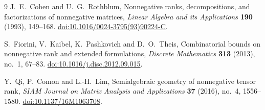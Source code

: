 \documentclass[11pt,a4paper]{article}
\theoremstyle{definition}
\begin{document}
{\small
\begin{thebibliography}{9}
J.~E.~Cohen and U.~G.~Rothblum,
Nonnegative ranks, decompositions, and factorizations of nonnegative matrices,
\textit{Linear Algebra and its Applications} \textbf{190} (1993), 149--168.
\href{https://doi.org/10.1016/0024-3795(93)90224-C}{doi:10.1016/0024-3795(93)90224-C}.

S.~Fiorini, V.~Kaibel, K.~Pashkovich and D.~O.~Theis,
Combinatorial bounds on nonnegative rank and extended formulations,
\textit{Discrete Mathematics} \textbf{313} (2013), no.~1, 67--83.
\href{https://doi.org/10.1016/j.disc.2012.09.015}{doi:10.1016/j.disc.2012.09.015}.

Y.~Qi, P.~Comon and L.-H.~Lim,
Semialgebraic geometry of nonnegative tensor rank,
\textit{SIAM Journal on Matrix Analysis and Applications} \textbf{37} (2016),
no.~4, 1556--1580.
\href{https://doi.org/10.1137/16M1063708}{doi:10.1137/16M1063708}.
\end{thebibliography}}
\end{document}
